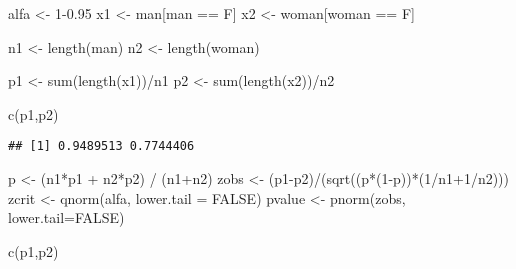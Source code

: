 \documentclass[
  a4paper]{article}
\newenvironment{Shaded}{\begin{snugshade}}{\end{snugshade}}
\newcommand{\AttributeTok}[1]{\textcolor[rgb]{0.77,0.63,0.00}{#1}}
\newcommand{\ConstantTok}[1]{\textcolor[rgb]{0.00,0.00,0.00}{#1}}
\newcommand{\DecValTok}[1]{\textcolor[rgb]{0.00,0.00,0.81}{#1}}
\newcommand{\FloatTok}[1]{\textcolor[rgb]{0.00,0.00,0.81}{#1}}
\newcommand{\FunctionTok}[1]{\textcolor[rgb]{0.00,0.00,0.00}{#1}}
\newcommand{\NormalTok}[1]{#1}
\newcommand{\OtherTok}[1]{\textcolor[rgb]{0.56,0.35,0.01}{#1}}
\newcommand{\SpecialCharTok}[1]{\textcolor[rgb]{0.00,0.00,0.00}{#1}}
\newcommand{\StringTok}[1]{\textcolor[rgb]{0.31,0.60,0.02}{#1}}
\begin{document}
\begin{Shaded}
\begin{Highlighting}[]
\NormalTok{alfa }\OtherTok{\textless{}{-}} \DecValTok{1}\FloatTok{{-}0.95}
\NormalTok{x1 }\OtherTok{\textless{}{-}}\NormalTok{ man[man }\SpecialCharTok{==} \StringTok{\textquotesingle{}F\textquotesingle{}}\NormalTok{]}
\NormalTok{x2 }\OtherTok{\textless{}{-}}\NormalTok{ woman[woman }\SpecialCharTok{==} \StringTok{\textquotesingle{}F\textquotesingle{}}\NormalTok{]}

\NormalTok{n1 }\OtherTok{\textless{}{-}} \FunctionTok{length}\NormalTok{(man)}
\NormalTok{n2 }\OtherTok{\textless{}{-}} \FunctionTok{length}\NormalTok{(woman)}

\NormalTok{p1 }\OtherTok{\textless{}{-}} \FunctionTok{sum}\NormalTok{(}\FunctionTok{length}\NormalTok{(x1))}\SpecialCharTok{/}\NormalTok{n1}
\NormalTok{p2 }\OtherTok{\textless{}{-}} \FunctionTok{sum}\NormalTok{(}\FunctionTok{length}\NormalTok{(x2))}\SpecialCharTok{/}\NormalTok{n2}

\FunctionTok{c}\NormalTok{(p1,p2)}
\end{Highlighting}
\end{Shaded}

\begin{verbatim}
## [1] 0.9489513 0.7744406
\end{verbatim}

\begin{Shaded}
\begin{Highlighting}[]
\NormalTok{p }\OtherTok{\textless{}{-}}\NormalTok{ (n1}\SpecialCharTok{*}\NormalTok{p1 }\SpecialCharTok{+}\NormalTok{ n2}\SpecialCharTok{*}\NormalTok{p2) }\SpecialCharTok{/}\NormalTok{ (n1}\SpecialCharTok{+}\NormalTok{n2)}
\NormalTok{zobs }\OtherTok{\textless{}{-}}\NormalTok{ (p1}\SpecialCharTok{{-}}\NormalTok{p2)}\SpecialCharTok{/}\NormalTok{(}\FunctionTok{sqrt}\NormalTok{((p}\SpecialCharTok{*}\NormalTok{(}\DecValTok{1}\SpecialCharTok{{-}}\NormalTok{p))}\SpecialCharTok{*}\NormalTok{(}\DecValTok{1}\SpecialCharTok{/}\NormalTok{n1}\SpecialCharTok{+}\DecValTok{1}\SpecialCharTok{/}\NormalTok{n2)))}
\NormalTok{zcrit }\OtherTok{\textless{}{-}} \FunctionTok{qnorm}\NormalTok{(alfa, }\AttributeTok{lower.tail =} \ConstantTok{FALSE}\NormalTok{)}
\NormalTok{pvalue }\OtherTok{\textless{}{-}} \FunctionTok{pnorm}\NormalTok{(zobs, }\AttributeTok{lower.tail=}\ConstantTok{FALSE}\NormalTok{)}

\FunctionTok{c}\NormalTok{(p1,p2)}
\end{Highlighting}
\end{Shaded}
\end{document}
